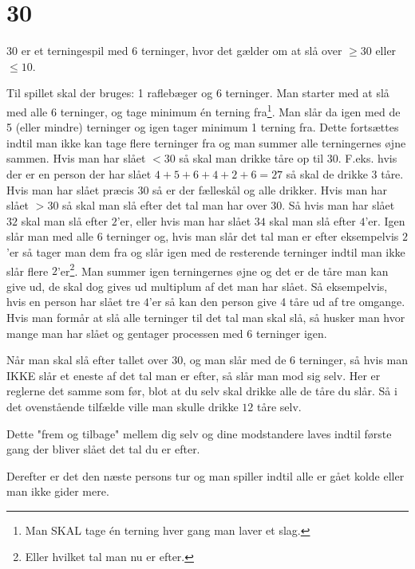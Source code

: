 \chapter{30}

30 er et terningespil med 6 terninger, hvor det gælder om at slå over $\geq 30$ eller $\leq 10$.

Til spillet skal der bruges: 1 raflebæger og 6 terninger. Man starter med at slå med alle 6 terninger, og tage minimum én terning fra\footnote{Man SKAL tage én terning hver gang man laver et slag.}. Man slår da igen med de 5 (eller mindre) terninger og igen tager minimum 1 terning fra. Dette fortsættes indtil man ikke kan tage flere terninger fra og man summer alle terningernes øjne sammen. 
Hvis man har slået $<30$ så skal man drikke tåre op til $30$. F.eks. hvis der er en person der har slået $4 + 5 + 6 + 4 + 2 + 6 = 27$ så skal de drikke 3 tåre.
Hvis man har slået præcis $30$ så er der fælleskål og alle drikker.
Hvis man har slået $>30$ så skal man slå efter det tal man har over $30$. Så hvis man har slået $32$ skal man slå efter $2$'er, eller hvis man har slået $34$ skal man slå efter $4$'er.
Igen slår man med alle $6$ terninger og, hvis man slår det tal man er efter eksempelvis $2$'er så tager man dem fra og slår igen med de resterende terninger indtil man ikke slår flere $2$'er\footnote{Eller hvilket tal man nu er efter.}. Man summer igen terningernes øjne og det er de tåre man kan give ud, de skal dog gives ud multiplum af det man har slået. Så eksempelvis, hvis en person har slået tre $4$'er så kan den person give 4 tåre ud af tre omgange. Hvis man formår at slå alle terninger til det tal man skal slå, så husker man hvor mange man har slået og gentager processen med 6 terninger igen.

Når man skal slå efter tallet over $30$, og man slår med de $6$ terninger, så hvis man IKKE slår et eneste af det tal man er efter, så slår man mod sig selv. Her er reglerne det samme som før, blot at du selv skal drikke alle de tåre du slår. Så i det ovenstående tilfælde ville man skulle drikke $12$ tåre selv.

Dette "frem og tilbage" mellem dig selv og dine modstandere laves indtil første gang der bliver slået det tal du er efter.

Derefter er det den næste persons tur og man spiller indtil alle er gået kolde eller man ikke gider mere.


